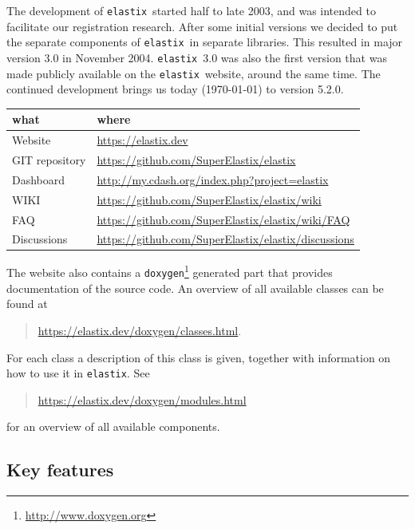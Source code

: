 \documentclass[]{report}
\newcommand{\elastix}{\texttt{elastix}}
\begin{document}
The development of \elastix\ started half to late 2003, and was
intended to facilitate our registration research. After some initial
versions we decided to put the separate components of \elastix\ in
separate libraries. This resulted in major version 3.0 in November
2004. \elastix\ 3.0 was also the first version that was made
publicly available on the \elastix\ website, around the same time.
The continued development brings us today (\today) to version 5.2.0.

\begin{table}[h!]
\begin{tabular}{l|l}
what & where \\
\hline
Website        & \url{https://elastix.dev} \\
GIT repository & \url{https://github.com/SuperElastix/elastix} \\
Dashboard      & \url{http://my.cdash.org/index.php?project=elastix} \\
WIKI           & \url{https://github.com/SuperElastix/elastix/wiki} \\
FAQ            & \url{https://github.com/SuperElastix/elastix/wiki/FAQ} \\
Discussions    & \url{https://github.com/SuperElastix/elastix/discussions}
\end{tabular}
\end{table}

The website also contains a
\texttt{doxygen}\footnote{\url{http://www.doxygen.org}} generated part that
provides documentation of the source code. An overview of all available classes
can be found at
\begin{quote}
\url{https://elastix.dev/doxygen/classes.html}.
\end{quote}
For each class a description of this class is given, together with
information on how to use it in \elastix. See
\begin{quote}
\url{https://elastix.dev/doxygen/modules.html}
\end{quote}
for an overview of all available components.

\subsection{Key features}\label{sec:elastix:key}
\end{document}
